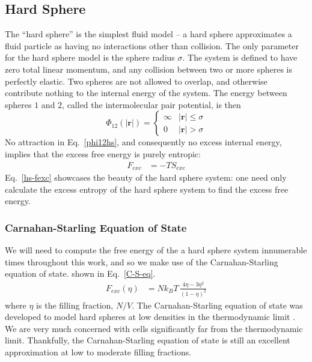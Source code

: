 \documentclass[12pt]{article}
\renewcommand{\vec}[1]{\mathbf{#1}}
\begin{document}
\subsection{Hard Sphere}
The ``hard sphere'' is the simplest fluid model -- a hard sphere approximates a fluid particle as having no interactions other than collision. The only parameter for the hard sphere model is the sphere radius $\sigma$. The system is defined to have zero total linear momentum, and any collision between two or more spheres is perfectly elastic. Two spheres are not allowed to overlap, and otherwise contribute nothing to the internal energy of the system. The energy between spheres $1$ and $2$, called the intermolecular pair potential, is then
\begin{equation} 
    \Phi_{12}(|\vec{r}|) = \begin{cases}\infty & |\vec{r}|\leq \sigma\\ 0 & |\vec{r}| > \sigma \end{cases}
\label{phi12hs}
\end{equation}
No attraction in Eq.~\ref{phi12hs}, and consequently no excess internal energy, implies that the excess free energy is purely entropic: 
\begin{align}
    F_{exc} &= -T S_{exc}
    \label{hs-fexc}
\end{align}
Eq.~\ref{hs-fexc} showcases the beauty of the hard sphere system: one need only calculate the excess entropy of the hard sphere system to find the excess free energy.
\subsubsection{Carnahan-Starling Equation of State}
We will need to compute the free energy of the a hard sphere system innumerable times throughout this work, and so we make use of the Carnahan-Starling equation of state. shown in Eq.~\ref{C-S-eq}.
\begin{align}
    F_{exc}(\eta) &= N k_B T\,\frac{4\eta - 3\eta^2}{(1-\eta)^2}
    \label{C-S-eq}  
\end{align} 
where $\eta$ is the filling fraction, $N/V$. The Carnahan-Starling equation of state was developed to model hard spheres at low densities in the thermodynamic limit \cite{cs-eos}. We are very much concerned with cells significantly far from the thermodynamic limit. Thankfully, the Carnahan-Starling equation of state is still an excellent approximation at low to moderate filling fractions.\\ 
\end{document}
